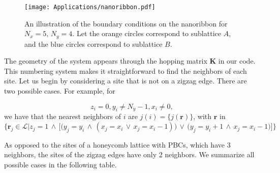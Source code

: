 \begin{figure}[H]
	\centering
\texttt{[image: Applications/nanoribbon.pdf]}
	\caption[Boundary conditions on the nanoribbon.]{An illustration of the boundary conditions on the nanoribbon for $N_x = 5, \, N_y = 4$. Let the orange circles correspond to sublattice $A$, and the blue circles correspond to sublattice $B$.}
	\label{fig:nanoribbon}
\end{figure}

The geometry of the system appears through the hopping matrix $\bm K$ in our code.
This numbering system makes it straightforward to find the neighbors of each site.
Let us begin by considering a site that is not on a zigzag edge.
There are two possible cases. For example, for 

\begin{equation*}
z_i = 0, y_i \neq N_y - 1, x_i \neq 0 ,
\end{equation*}
we have that the nearest neighbors of $i$ are $ j (i) = \{ j ( \bm r) \}$, with $\bm r$ in
\begin{equation*}
\bigg\{ \bm r_j \in \mathcal{L} \bigg| z_j = 1 \,\land\, \bigg[ \bigg( y_j = y_i  \,\land\, ( x_j = x_i \,\lor\, x_j = x_i - 1) \bigg) \,\lor\, \bigg( y_j = y_i + 1  \,\land\, x_j = x_i - 1  \bigg)  \bigg] \bigg\}
\end{equation*}

As opposed to the sites of a honeycomb lattice with \acp{PBC}, which have 3 neighbors, the sites of the zigzag edges have only 2 neighbors.
We summarize all possible cases in the following table.


